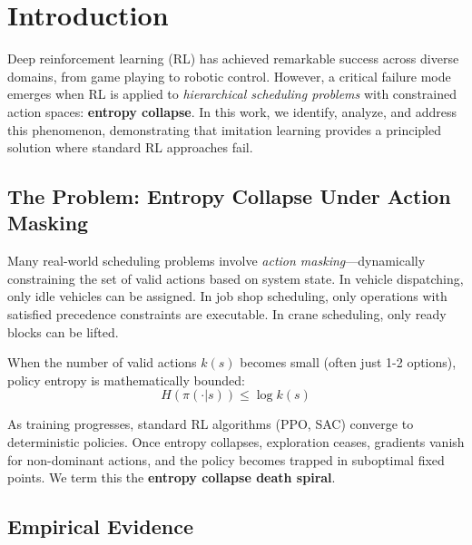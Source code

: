 
\section{Introduction}
\label{sec:introduction}

Deep reinforcement learning (RL) has achieved remarkable success across diverse domains, from game playing to robotic control. However, a critical failure mode emerges when RL is applied to \textit{hierarchical scheduling problems} with constrained action spaces: \textbf{entropy collapse}. In this work, we identify, analyze, and address this phenomenon, demonstrating that imitation learning provides a principled solution where standard RL approaches fail.

\subsection{The Problem: Entropy Collapse Under Action Masking}

Many real-world scheduling problems involve \textit{action masking}---dynamically constraining the set of valid actions based on system state. In vehicle dispatching, only idle vehicles can be assigned. In job shop scheduling, only operations with satisfied precedence constraints are executable. In crane scheduling, only ready blocks can be lifted.

When the number of valid actions $k(s)$ becomes small (often just 1-2 options), policy entropy is mathematically bounded:
\begin{equation}
H(\pi(\cdot|s)) \leq \log k(s)
\end{equation}

As training progresses, standard RL algorithms (PPO, SAC) converge to deterministic policies. Once entropy collapses, exploration ceases, gradients vanish for non-dominant actions, and the policy becomes trapped in suboptimal fixed points. We term this the \textbf{entropy collapse death spiral}.

\subsection{Empirical Evidence}

